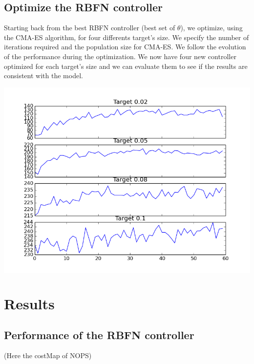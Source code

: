 \documentclass[pdftex,a4paper,11pt]{report}
\begin{document}
\subsection{Optimize the RBFN controller}
Starting back from the best RBFN controller (best set of $\theta$), we optimize, using the CMA-ES algorithm, for four differents target's size.
We specify the number of iterations required and the population size for CMA-ES. We follow the evolution of the performance during the optimization.
We now have four new controller optimized for each target's size and we can evaluate them to see if the results are consistent with the model.
\begin{center}
\includegraphics[scale=0.5]{figures/cmaesProgression6000.png}
\end{center}

\section{Results}
\subsection{Performance of the RBFN controller}
(Here the costMap of NOPS)
\end{document}
